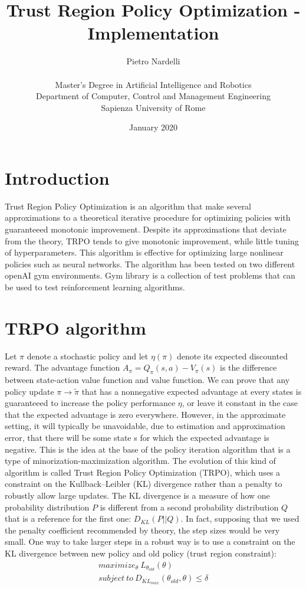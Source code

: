 \documentclass[11pt]{article}
\title{Trust Region Policy Optimization - Implementation}
\author{Pietro Nardelli \\ \\ 
        Master's Degree in Artificial Intelligence and Robotics \\
        Department of Computer, Control and Management Engineering \\
        Sapienza University of Rome}
\date{January 2020}
\begin{document}
\maketitle

\section{Introduction}
Trust Region Policy Optimization is an algorithm that make several
approximations to a theoretical iterative procedure for optimizing policies with
guaranteeed monotonic improvement. Despite its approximations that deviate from
the theory, TRPO tends to give monotonic improvement, while little tuning of
hyperparameters. This algorithm is effective for optimizing large nonlinear
policies such as neural networks. The algorithm has been tested on two different
openAI gym environments. Gym library is a collection of test problems that can
be used to test reinforcement learning algorithms. 

\section{TRPO algorithm}\label{section-trpo}
Let $\pi$ denote a stochastic policy and let $\eta(\pi)$ denote its expected discounted reward. The
advantage function $A_{\pi} = Q_{\pi}(s, a) - V_{\pi}(s)$ is the difference between state-action
value function and value function. We can prove that any policy update $\pi \rightarrow \tilde{\pi}$
that has a nonnegative expected advantage at every states is guaranteeed to increase the policy
performance $\eta$, or leave it constant in the case that the expected advantage is zero everywhere.
However, in the approximate setting, it will typically be unavoidable, due to estimation and
approximation error, that there will be some state s for which the expected advantage is negative.
This is the idea at the base of the policy iteration algorithm that is a type of
minorization-maximization algorithm. The evolution of this kind of algorithm is called Trust Region
Policy Optimization (TRPO), which uses a constraint on the Kullback–Leibler (KL) divergence rather than a penalty to
robustly allow large updates.
The KL divergence is a measure of how one probability distribution $P$ is different from a second
probability distribution $Q$ that is a reference for the first one: $D_{KL}(P||Q)$.
In fact, supposing that we used the penalty coefficient recommended by theory, the step sizes would
be very small. One way to take larger steps in a robust way is to use a constraint on the KL
divergence between new policy and old policy (trust region constraint):
\begin{equation} 
        \begin{split}
        maximize_{\theta} \ L_{\theta_{old}}(\theta) 
        \\ \label{eq:1}
        subject \  to \ D_{KL_{max}}(\theta_{old}, \theta) \leq \delta
        \end{split}
\end{equation}
\end{document}
